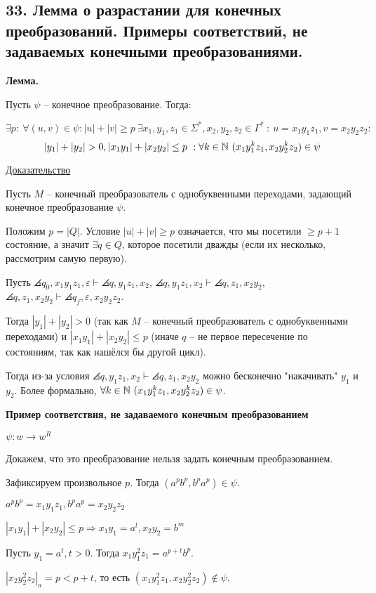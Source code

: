 \subsection{33. Лемма о разрастании для конечных преобразований. Примеры соответствий, не задаваемых конечными преобразованиями.}

\textbf{Лемма.}

Пусть $\psi$ -- конечное преобразование. Тогда:

$$
\exists p:\ \forall (u, v) \in \psi : |u| + |v| \geq p\ 
\exists x_1, y_1, z_1 \in \Sigma^{*},
x_2, y_2, z_2 \in \Gamma^{*}\ :\ 
u = x_1 y_1 z_1, v = x_2 y_2 z_2:
$$
$$
|y_1| + |y_2| > 0, |x_1 y_1| + |x_2 y_2| \leq p\ :
\forall k \in \mathbb{N} \ (x_1 y_1^k z_1, x_2 y_2^k z_2) \in \psi
$$

\underline{Доказательство}

Пусть $M$ -- конечный преобразователь с однобуквенными переходами, задающий конечное преобразование $\psi$.

Положим $p = |Q|$. Условие $|u| + |v| \geq p$ означается, что мы посетили $\geq p + 1$ состояние, а значит $\exists q \in Q$, которое посетили дважды (если их несколько, рассмотрим самую первую).

Пусть $\angles{q_0, x_1 y_1 z_1, \varepsilon} \vdash \angles{q, y_1 z_1, x_2}$,
$\angles{q, y_1 z_1, x_2} \vdash \angles{q, z_1, x_2 y_2}$,
$\angles{q, z_1, x_2 y_2} \vdash \angles{q_f, \varepsilon, x_2 y_2 z_2}$.

Тогда $|y_1| + |y_2| > 0$ (так как $M$ -- конечный преобразователь с однобуквенными переходами) и $|x_1 y_1| + |x_2 y_2| \leq p$ (иначе $q$ -- не первое пересечение по состояниям, так как нашёлся бы другой цикл).

Тогда из-за условия $\angles{q, y_1 z_1, x_2} \vdash \angles{q, z_1, x_2 y_2}$ можно бесконечно "накачивать" $y_1$ и $y_2$. 
Более формально, $\forall k \in \mathbb{N} \ (x_1 y_1^k z_1, x_2 y_2^k z_2) \in \psi$.

\textbf{Пример соответствия, не задаваемого конечным преобразованием}

$\psi: w \to w^R$

Докажем, что это преобразование нельзя задать конечным преобразованием.

Зафиксируем произвольное $p$. Тогда $(a^p b^p, b^p a^p) \in \psi$.

$a^p b^p = x_1 y_1 z_1, b^p a^p = x_2 y_2 z_2$

$|x_1 y_1| + |x_2 y_2| \leq p \Rightarrow x_1 y_1 = a^l, x_2 y_2 = b^m$

Пусть $y_1 = a^t, t > 0$. Тогда $x_1 y_1^2 z_1 = a^{p + t} b^p$.

$|x_2 y_2^2 z_2|_a = p < p + t$, то есть
$(x_1 y_1^2 z_1, x_2 y_2^2 z_2) \not \in \psi$.